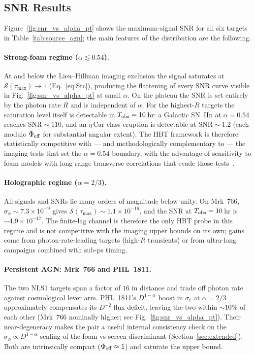 \documentclass[aps,prd,onecolumn,amsmath,amssymb]{revtex4-2}
\begin{document}
\subsection{SNR Results}
\label{sec:snr_results}

Figure~\ref{fig:snr_vs_alpha_pt} shows the maximum-signal SNR for all
six targets in Table~\ref{tab:source_agn}; the main features of the
distribution are the following.

\paragraph{Strong-foam regime ($\alpha\lesssim 0.54$).}
At and below the Lieu--Hillman imaging exclusion the signal saturates at
$\mathcal{S}(\tau_{\max})\to 1$ (Eq.~\eqref{eq:Stc}), producing the
flattening of every SNR curve visible in Fig.~\ref{fig:snr_vs_alpha_pt}
at small $\alpha$. On the plateau the SNR is set entirely by the photon
rate $R$ and is independent of $\alpha$. For the highest-$R$ targets
the saturation level itself is detectable in $T_{\rm obs}=10$\,hr: a
Galactic SN~IIn at $\alpha=0.54$ reaches SNR${}\sim 110$, and an
$\eta$\,Car-class eruption is detectable at SNR${}\sim 1.2$ (each
modulo $\Phi_{\rm eff}$ for substantial angular extent). The HBT
framework is therefore statistically competitive with --- and
methodologically complementary to --- the imaging tests that set the
$\alpha=0.54$ boundary, with the advantage of sensitivity to foam
models with long-range transverse correlations that evade those
tests~\cite{LeeZurekChen2024}.

\paragraph{Holographic regime ($\alpha=2/3$).}
All signals and SNRs lie many orders of magnitude below unity. On
Mrk~766, $\sigma_\phi\sim 7.3\times 10^{-9}$ gives
$\mathcal{S}(\tau_{\max})\sim 1.1\times 10^{-16}$, and the SNR at
$T_{\rm obs}=10$\,hr is ${\sim}4.9\times 10^{-17}$.  The finite-lag
channel is therefore the only HBT probe in this regime and is not
competitive with the imaging upper bounds on its own; gains come from
photon-rate-leading targets (high-$R$ transients) or from
ultra-long campaigns combined with sub-ps timing.

\paragraph{Persistent AGN: Mrk~766 and PHL~1811.}
The two NLS1 targets span a factor of $16$ in distance and trade off
photon rate against cosmological lever arm. PHL~1811's $D^{1-\alpha}$
boost in $\sigma_\ell$ at $\alpha=2/3$ approximately compensates its
$D^{-2}$ flux deficit, leaving the two within ${\sim}10$\% of each
other (Mrk~766 nominally higher; see
Fig.~\ref{fig:snr_vs_alpha_pt}). Their near-degeneracy makes the pair
a useful internal consistency check on the $\sigma_\phi\propto D^{1-\alpha}$
scaling of the foam-vs-screen discriminant (Section~\ref{sec:extended}).
Both are intrinsically compact ($\Phi_{\rm eff}\approx 1$) and saturate
the upper bound.
\end{document}
